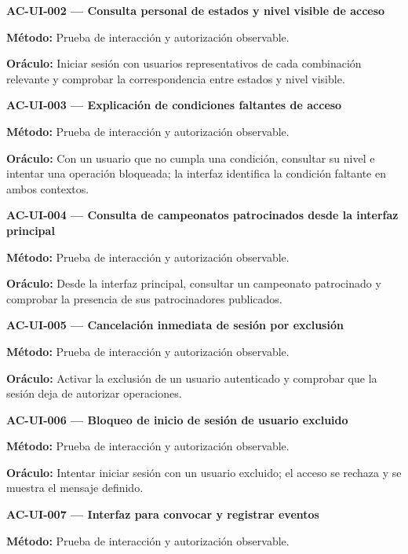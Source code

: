 \documentclass[10pt,letterpaper]{article}
\begin{document}
\noindent\textbf{AC-UI-002 --- Consulta personal de estados y nivel visible de acceso}\par
\textbf{Método:} Prueba de interacción y autorización observable.\par
\textbf{Oráculo:} Iniciar sesión con usuarios representativos de cada combinación relevante y comprobar la correspondencia entre estados y nivel visible.\par\vspace{0.45em}
\noindent\textbf{AC-UI-003 --- Explicación de condiciones faltantes de acceso}\par
\textbf{Método:} Prueba de interacción y autorización observable.\par
\textbf{Oráculo:} Con un usuario que no cumpla una condición, consultar su nivel e intentar una operación bloqueada; la interfaz identifica la condición faltante en ambos contextos.\par\vspace{0.45em}
\noindent\textbf{AC-UI-004 --- Consulta de campeonatos patrocinados desde la interfaz principal}\par
\textbf{Método:} Prueba de interacción y autorización observable.\par
\textbf{Oráculo:} Desde la interfaz principal, consultar un campeonato patrocinado y comprobar la presencia de sus patrocinadores publicados.\par\vspace{0.45em}
\noindent\textbf{AC-UI-005 --- Cancelación inmediata de sesión por exclusión}\par
\textbf{Método:} Prueba de interacción y autorización observable.\par
\textbf{Oráculo:} Activar la exclusión de un usuario autenticado y comprobar que la sesión deja de autorizar operaciones.\par\vspace{0.45em}
\noindent\textbf{AC-UI-006 --- Bloqueo de inicio de sesión de usuario excluido}\par
\textbf{Método:} Prueba de interacción y autorización observable.\par
\textbf{Oráculo:} Intentar iniciar sesión con un usuario excluido; el acceso se rechaza y se muestra el mensaje definido.\par\vspace{0.45em}
\noindent\textbf{AC-UI-007 --- Interfaz para convocar y registrar eventos}\par
\textbf{Método:} Prueba de interacción y autorización observable.\par
\end{document}

